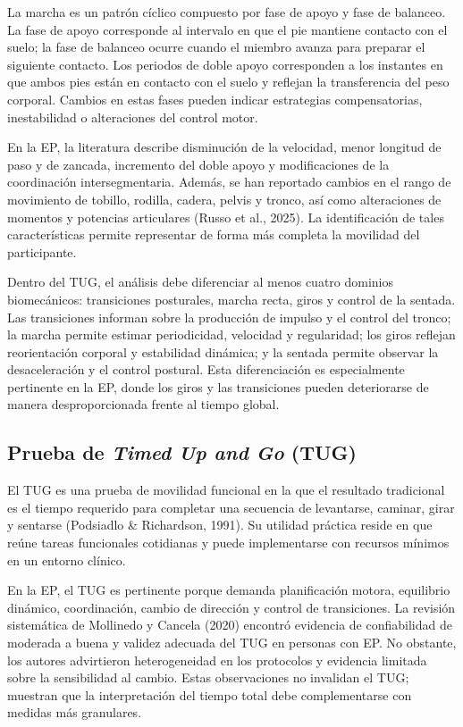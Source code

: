 \documentclass[12pt,a4paper]{article}
\begin{document}
La marcha es un patrón cíclico compuesto por fase de apoyo y fase de balanceo. La fase de apoyo corresponde al intervalo en que el pie mantiene contacto con el suelo; la fase de balanceo ocurre cuando el miembro avanza para preparar el siguiente contacto. Los periodos de doble apoyo corresponden a los instantes en que ambos pies están en contacto con el suelo y reflejan la transferencia del peso corporal. Cambios en estas fases pueden indicar estrategias compensatorias, inestabilidad o alteraciones del control motor.

En la EP, la literatura describe disminución de la velocidad, menor longitud de paso y de zancada, incremento del doble apoyo y modificaciones de la coordinación intersegmentaria. Además, se han reportado cambios en el rango de movimiento de tobillo, rodilla, cadera, pelvis y tronco, así como alteraciones de momentos y potencias articulares (Russo et al., 2025). La identificación de tales características permite representar de forma más completa la movilidad del participante.

Dentro del TUG, el análisis debe diferenciar al menos cuatro dominios biomecánicos: transiciones posturales, marcha recta, giros y control de la sentada. Las transiciones informan sobre la producción de impulso y el control del tronco; la marcha permite estimar periodicidad, velocidad y regularidad; los giros reflejan reorientación corporal y estabilidad dinámica; y la sentada permite observar la desaceleración y el control postural. Esta diferenciación es especialmente pertinente en la EP, donde los giros y las transiciones pueden deteriorarse de manera desproporcionada frente al tiempo global.

\subsection{Prueba de \emph{Timed Up and Go} (TUG)}\label{sec:tug}

El TUG es una prueba de movilidad funcional en la que el resultado tradicional es el tiempo requerido para completar una secuencia de levantarse, caminar, girar y sentarse (Podsiadlo \& Richardson, 1991). Su utilidad práctica reside en que reúne tareas funcionales cotidianas y puede implementarse con recursos mínimos en un entorno clínico.

En la EP, el TUG es pertinente porque demanda planificación motora, equilibrio dinámico, coordinación, cambio de dirección y control de transiciones. La revisión sistemática de Mollinedo y Cancela (2020) encontró evidencia de confiabilidad de moderada a buena y validez adecuada del TUG en personas con EP. No obstante, los autores advirtieron heterogeneidad en los protocolos y evidencia limitada sobre la sensibilidad al cambio. Estas observaciones no invalidan el TUG; muestran que la interpretación del tiempo total debe complementarse con medidas más granulares.
\end{document}
